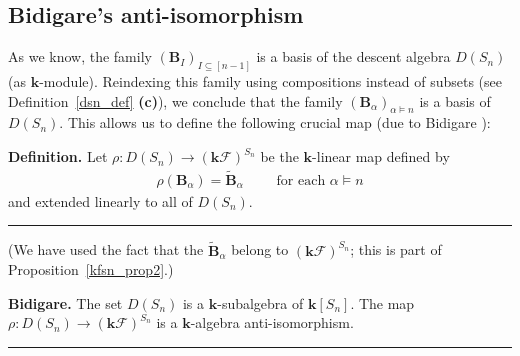 \documentclass[12pt]{article}
\theoremstyle{definition}%
\newtheorem{thm}{Theorem}[section]
\theoremstyle{definition}%
\newtheorem{defn}[thm]{Definition}
\theoremstyle{remark}%
\newcommand{\tup}[1]{\left( #1 \right)}
\newcommand{\interval}[1]{\left[ #1 \right]} %
\newcommand{\kk}{\mathbf{k}}
\newcommand{\ksn}{\kk\left[S_n\right]}
\newcommand{\kf}{\kk\mathcal{F}}
\newcommand{\kfsn}{\left(\kf\right)^{S_n}}
\newcommand{\dsn}{D\left(S_n\right)}
\newcommand{\BB}{\mathbf{B}}
\newcommand{\BBa}{\mathbf{B}_{\alpha}}
\newcommand{\BBta}{\widetilde{\mathbf{B}}_{\alpha}}
\newenvironment{thm}[1][Theorem]{\noindent\textbf{#1.} }{\ \rule{0.5em}{0.5em}}
\newenvironment{defn}[1][Definition]{\noindent\textbf{#1.} }{\ \rule{0.5em}{0.5em}}
\begin{document}
\subsection{Bidigare's anti-isomorphism}

As we know, the family $\tup{\BB_I}_{I \subseteq \interval{n-1}}$ is a basis of the descent algebra $\dsn$ (as $\kk$-module).
Reindexing this family using compositions instead of subsets (see Definition~\ref{dsn_def} \textbf{(c)}), we conclude that the family $\tup{\BBa}_{\alpha \models n}$ is a basis of $\dsn$.
This allows us to define the following crucial map (due to Bidigare \cite[Theorem 3.8.1]{Bidigare-thesis}):

\begin{defn}
\label{defn_rho}
	Let $\rho : \dsn \to \kfsn$ be the $\kk$-linear map defined by
    \begin{align}
    \rho\tup{ \BBa } = \BBta \qquad \text{ for each } \alpha \models n
    \label{eq.rhoBa}
    \end{align}
    and extended linearly to all of $\dsn$.
\end{defn}

(We have used the fact that the $\BBta$ belong to $\kfsn$; this is part of Proposition~\ref{kfsn_prop2}.)

\begin{thm}[Bidigare]
    \label{dsn_kfsn_morph}
    The set $\dsn$ is a $\kk$-subalgebra of $\ksn$.
    The map $ \rho : \dsn \to \kfsn $ is a $ \kk $-algebra anti-isomorphism. 
\end{thm}
\end{document}
